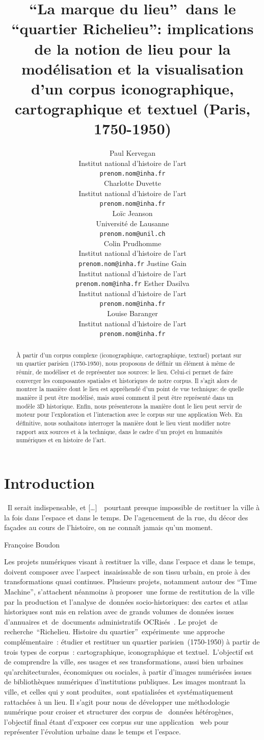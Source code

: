 \documentclass[11pt,french]{article}
\title{\enquote{La marque du lieu} dans le \enquote{quartier Richelieu}: implications de la notion de lieu pour la modélisation et la visualisation d’un corpus iconographique, cartographique et textuel (Paris, 1750-1950)}
\author{
	Paul Kervegan \\ 
	Institut national d'histoire de l'art \\
	\texttt{prenom.nom@inha.fr} \\
	\And Charlotte Duvette \\
	Institut national d'histoire de l'art \\
	\texttt{prenom.nom@inha.fr} \\
	\AND Loïc Jeanson \\ 
	Université de Lausanne \\
	\texttt{prenom.nom@unil.ch} \\
	\And Colin Prudhomme \\
	Institut national d'histoire de l'art \\
	\texttt{prenom.nom@inha.fr}
	\AND Justine Gain \\
	Institut national d'histoire de l'art \\
	\texttt{prenom.nom@inha.fr}
	\And Esther Dasilva \\
	Institut national d'histoire de l'art \\
	\texttt{prenom.nom@inha.fr} \\
	\AND Louise Baranger \\
	Institut national d'histoire de l'art \\
	\texttt{prenom.nom@inha.fr}
}
\begin{document}
\maketitle

\begin{abstract}
À partir d'un corpus complexe (iconographique, cartographique, textuel) portant sur un quartier parisien (1750-1950), nous proposons de définir un élément à même de réunir, de modéliser et de représenter nos sources: le lieu. Celui-ci permet de faire converger les composantes spatiales et historiques de notre corpus. Il s'agit alors de montrer la manière dont le lieu est appréhendé d'un point de vue technique: de quelle manière il peut être modélisé, mais aussi comment il peut être représenté dans un modèle 3D historique. Enfin, nous présenterons la manière dont le lieu peut servir de moteur pour l'exploration et l'interaction avec le corpus sur une application Web. En définitive, nous souhaitons interroger la manière dont le lieu vient modifier notre rapport aux sources et à la technique, dans le cadre d'un projet en humanités numériques et en histoire de l'art.
\end{abstract}

\section*{Introduction}
\epigraph{
	 Il serait indispensable, et […]  pourtant presque impossible de restituer la ville à la fois dans l'espace et dans le temps. De l'agencement de la rue, du décor des façades au cours de l'histoire, on ne connaît jamais qu'un moment.
}{Françoise Boudon \citep{boudon_systeme_1977}}

Les projets numériques visant à restituer la ville, dans l'espace et dans le temps, doivent composer avec l'aspect insaisissable de son tissu urbain, en proie à des transformations quasi continues. Plusieurs projets, notamment autour des \enquote{Time Machine}, s'attachent néanmoins à proposer une forme de restitution de la ville par la production et l'analyse de données socio-historiques: des cartes et atlas historiques sont mis en relation avec de grands volumes de données issues d'annuaires et de documents administratifs OCRisés \citep{khemakhem_fueling_2018,berenbaum_mining_2018,bell_automated_2020,di_leonardo_approche_2021,uchida_benchmark_2022}. Le projet de recherche \enquote{Richelieu. Histoire du quartier} expérimente une approche complémentaire : étudier et restituer un quartier parisien (1750-1950) à partir de trois types de corpus : cartographique, iconographique et textuel. L'objectif est de comprendre la ville, ses usages et ses transformations, aussi bien urbaines qu'architecturales, économiques ou sociales, à partir d'images numérisées issues de bibliothèques numériques d'institutions publiques. Les images montrant la ville, et celles qui y sont produites, sont spatialisées et systématiquement rattachées à un lieu. Il s'agit pour nous de développer une méthodologie numérique pour croiser et structurer des corpus de  données hétérogènes, l'objectif final étant d'exposer ces corpus sur une application  web pour représenter l'évolution urbaine dans le temps et l'espace.
\end{document}
